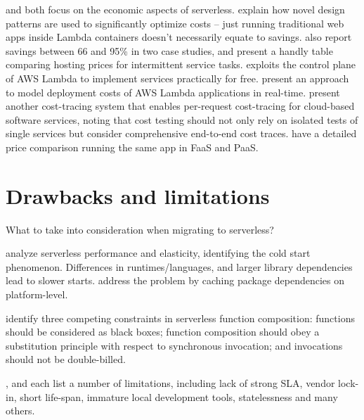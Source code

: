 \documentclass[utf8,english]{gradu3}
\begin{document}
\textcite{eivy2017wary} and \textcite{villamizar2016infrastructure} both focus on the economic aspects of serverless. \textcite{adzic2017serverless} explain how novel design patterns are used to significantly optimize costs -- just running traditional web apps inside Lambda containers doesn't necessarily equate to savings. \textcite{adzic2017serverless} also report savings between 66 and 95\% in two case studies, and present a handly table comparing hosting prices for intermittent service tasks. \textcite{spillner17exploiting} exploits the control plane of AWS Lambda to implement services practically for free. \textcite{leitner16modelcost} present an approach to model deployment costs of AWS Lambda applications in real-time. \textcite{kuhlenkamp17costradamus} present another cost-tracing system that enables per-request cost-tracing for cloud-based software services, noting that cost testing should not only rely on isolated tests of single services but consider comprehensive end-to-end cost traces. \textcite{albuquerque17faaspaas} have a detailed price comparison running the same app in FaaS and PaaS.

\section{Drawbacks and limitations} \label{sec:limitations}

What to take into consideration when migrating to serverless?

\textcite{lloydserverless} analyze serverless performance and elasticity, identifying the cold start phenomenon. Differences in runtimes/languages, and larger library dependencies lead to slower starts. \textcite{oakes17pipsqueak} address the problem by caching package dependencies on platform-level.

\textcite{baldini17trilemma} identify three competing constraints in serverless function composition: functions should be considered as black boxes; function composition should obey a substitution principle with respect to synchronous invocation; and invocations should not be double-billed.

\textcite{robert2016serverlessarchitectures}, \textcite{adzic2017serverless} and \textcite{baldini17currentTrends} each list a number of limitations, including lack of strong SLA, vendor lock-in, short life-span, immature local development tools, statelessness and many others.
\end{document}
